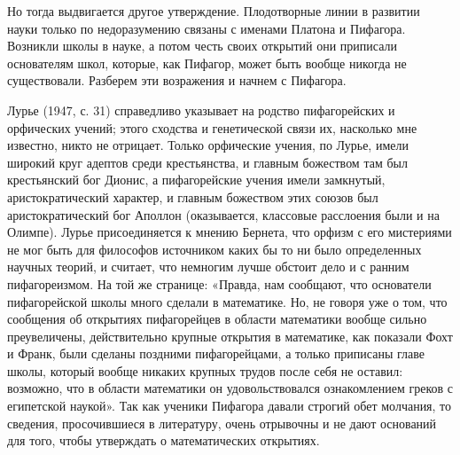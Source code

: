 Но тогда выдвигается другое утверждение. Плодотворные линии в развитии
науки только  по недоразумению связаны  с именами Платона  и Пифагора.
Возникли школы  в науке,  а потом честь  своих открытий  они приписали
основателям школ, которые,  как Пифагор, может быть  вообще никогда не
существовали. Разберем эти возражения и начнем с Пифагора.

Лурье (1947, с.  31) справедливо указывает на  родство пифагорейских и
орфических учений;  этого сходства и генетической  связи их, насколько
мне известно, никто  не отрицает. Только орфические  учения, по Лурье,
имели широкий круг адептов среди крестьянства, и главным божеством там
был крестьянский  бог Дионис, а пифагорейские  учения имели замкнутый,
аристократический  характер,  и  главным  божеством  этих  союзов  был
аристократический бог Аполлон  (оказывается, классовые расслоения были
и на Олимпе). Лурье присоединяется к  мнению Бернета, что орфизм с его
мистериями  не  мог быть  для  философов  источником  каких бы  то  ни
было  определенных  научных  теорий,  и считает,  что  немногим  лучше
обстоит дело  и с ранним  пифагореизмом. На той же  странице: «Правда,
нам  сообщают,  что основатели  пифагорейской  школы  много сделали  в
математике.  Но, не  говоря  уже  о том,  что  сообщения об  открытиях
пифагорейцев   в  области   математики  вообще   сильно  преувеличены,
действительно  крупные  открытия в  математике,  как  показали Фохт  и
Франк,  были  сделаны  поздними   пифагорейцами,  а  только  приписаны
главе  школы, который  вообще  никаких крупных  трудов  после себя  не
оставил:  возможно,  что  в  области  математики  он  удовольствовался
ознакомлением греков  с египетской  наукой». Так как  ученики Пифагора
давали строгий обет молчания, то сведения, просочившиеся в литературу,
очень  отрывочны и  не дают  оснований  для того,  чтобы утверждать  о
математических открытиях.

